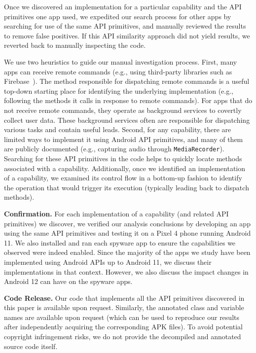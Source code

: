 Once we discovered an implementation for a particular capability and
the API primitives one app used, we expedited our search process
for other apps by searching for use of the same API primitives, and manually
reviewed the results to remove false positives. If this API similarity
approach did not yield results, we reverted back to manually
inspecting the code.

We use two heuristics to guide our manual investigation process.
First, many apps can receive remote commands (e.g., using third-party
libraries such as Firebase~\cite{Firebase21:online}).  The method
responsible for dispatching remote commands is a useful top-down
starting place for identifying the underlying implementation (e.g.,
following the methods it calls in response to remote commands).  For
apps that do not receive remote commands, they operate as background
services to covertly collect user data. These background services
often are responsible for dispatching various tasks and contain useful
leads. Second, for any capability, there are limited ways to implement
it using Android API primitives, and many of them are publicly
documented (e.g., capturing audio through \texttt{MediaRecorder}). Searching for these API primitives in the code helps to
quickly locate methods associated with a capability. Additionally,
once we identified an implementation of a capability, we examined its
control flow in a bottom-up fashion to identify the operation that
would trigger its execution (typically leading back to dispatch
methods).

\textbf{Confirmation.} For each implementation of a capability (and
related API primitives) we discover, we verified our analysis conclusions
by developing an app using the same API primitives and
testing it on a Pixel 4 phone running Android 11. We also installed and ran each spyware app to ensure the capabilities we observed were indeed enabled.
Since the majority of the apps we
study have been implemented using Android APIs up to Android 11, we
discuss their implementations in that context. However, we also
discuss the impact changes in Android 12 can have on the spyware apps.

\textbf{Code Release.}  Our code that implements all the API
primitives discovered in this paper is available upon
request. Similarly, the annotated class and variable names are
available upon request (which can be used to reproduce our results
after independently acquiring the corresponding APK files). To avoid
potential copyright infringement risks, we do not provide the
decompiled and annotated source code itself.

